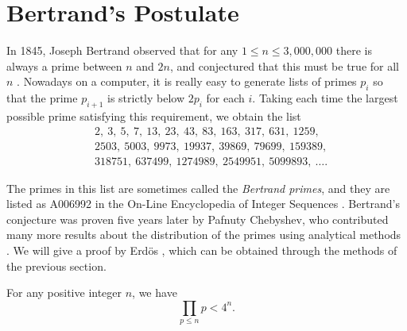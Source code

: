 \section{Bertrand's Postulate}

In 1845, Joseph Bertrand observed that for any $1\leq n \leq 3,000,000$ there is always a prime between $n$ and $2n$, and conjectured that this must be true for all $n$ \cite{bertrand1845}. Nowadays on a computer, it is really easy to generate lists of primes $p_i$ so that the prime $p_{i+1}$ is strictly below $2p_i$ for each $i$. Taking each time the largest possible prime satisfying this requirement, we obtain the list
\begin{align*}
  &2,\ 3,\ 5,\ 7,\ 13,\ 23,\ 43,\ 83,\ 163,\ 317,\ 631,\ 1259,\\
  &2503,\ 5003,\ 9973,\ 19937,\ 39869,\ 79699,\ 159389,\\
  &318751,\ 637499,\ 1274989,\ 2549951,\ 5099893,\ \ldots.
\end{align*}

The primes in this list are sometimes called the \emph{Bertrand primes}, and they are listed as A006992 in the On-Line Encyclopedia of Integer Sequences \cite{oeis:A006992}. Bertrand's conjecture was proven five years later by Pafnuty Chebyshev, who contributed many more results about the distribution of the primes using analytical methods \cite{chebyshev1850}. We will give a proof by Erd\"os \cite{erdos1932}, which can be obtained through the methods of the previous section.

\begin{lemma}\label{lemma:upper-bound-product-of-primes}
  For any positive integer $n$, we have
  \begin{equation*}
    \prod_{p\leq n}p< 4^n.
  \end{equation*}
\end{lemma}

